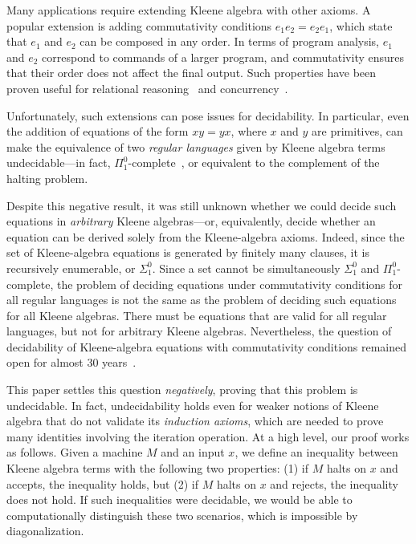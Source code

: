 \documentclass[11pt,a4paper]{amsart}
\theoremstyle{definition}
\begin{document}
Many applications require extending Kleene algebra with other axioms.  A popular
extension is adding commutativity conditions $e_1e_2 = e_2e_1$, which state that
$e_1$ and $e_2$ can be composed in any order.  In terms of program analysis,
$e_1$ and $e_2$ correspond to commands of a larger program, and commutativity
ensures that their order does not affect the final output.  Such properties have
been proven useful for relational
reasoning~\cite{Antonopoulos_Koskinen_Le_Nagasamudram_Naumann_Ngo_2022} and
concurrency~\cite{diekert_PartialCommutationTraces_1997}.

Unfortunately, such extensions can pose issues for decidability.  In particular,
even the addition of equations of the form $xy = yx$, where $x$ and $y$ are
primitives, can make the equivalence of two \emph{regular languages} given by
Kleene algebra terms~\cite{Kozen_1996,gibbons_DecidabilityProblemsRational_1986,berstel_TransductionsContextFreeLanguages_1979} undecidable---in fact,
$\Pi _1^0$-complete~\cite{DBLP:conf/lics/Kozen97}, or equivalent to the
complement of the halting problem.

Despite this negative result, it was still unknown whether we could decide such
equations in \emph{arbitrary} Kleene algebras---or, equivalently, decide whether
an equation can be derived solely from the Kleene-algebra axioms.  Indeed, since
the set of Kleene-algebra equations is generated by finitely many clauses, it is
recursively enumerable, or $ \Sigma _1^0$.  Since a set cannot be simultaneously
$ \Sigma _1^0$ and $ \Pi _1^0$-complete, the problem of deciding equations under
commutativity conditions for all regular languages is not the same as the
problem of deciding such equations for all Kleene algebras.  There must be
equations that are valid for all regular languages, but not for arbitrary Kleene
algebras.  Nevertheless, the question of decidability of Kleene-algebra
equations with commutativity conditions remained open for almost 30
years~\cite{DBLP:conf/lics/Kozen97}.

This paper settles this question \emph{negatively}, proving that this problem is
undecidable.  In fact, undecidability holds even for weaker notions of Kleene
algebra that do not validate its \emph{induction axioms}, which are needed to
prove many identities involving the iteration operation. At a high level, our
proof works as follows.  Given a machine $M$ and an input $x$, we define an
inequality between Kleene algebra terms with the following two properties: (1)
if $M$ halts on $x$ and accepts, the inequality holds, but (2) if $M$ halts on
$x$ and rejects, the inequality does not hold.  If such inequalities were
decidable, we would be able to computationally distinguish these two scenarios,
which is impossible by diagonalization.
\end{document}
